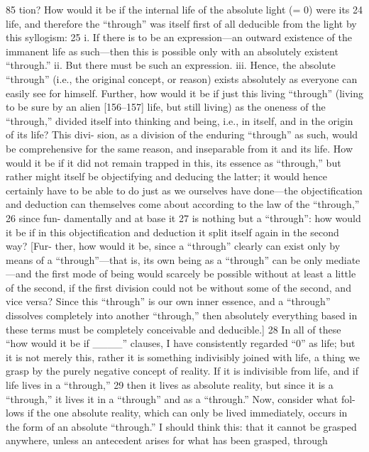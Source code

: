 85
tion? How would it be if the internal life of the absolute light (= 0) were its 24
life, and therefore the “through” was itself first of all deducible from the light
by this syllogism: 25
i. If there is to be an expression—an outward existence of the immanent life
as such—then this is possible only with an absolutely existent “through.”
ii. But there must be such an expression.
iii. Hence, the absolute “through” (i.e., the original concept, or reason) exists
absolutely as everyone can easily see for himself.
Further, how would it be if just this living “through” (living to be sure by
an alien [156–157] life, but still living) as the oneness of the “through,” divided
itself into thinking and being, i.e., in itself, and in the origin of its life? This divi-
sion, as a division of the enduring “through” as such, would be comprehensive
for the same reason, and inseparable from it and its life. How would it be if it
did not remain trapped in this, its essence as “through,” but rather might itself
be objectifying and deducing the latter; it would hence certainly have to be
able to do just as we ourselves have done—the objectification and deduction
can themselves come about according to the law of the “through,” 26 since fun-
damentally and at base it 27 is nothing but a “through”: how would it be if in
this objectification and deduction it split itself again in the second way? [Fur-
ther, how would it be, since a “through” clearly can exist only by means of a
“through”—that is, its own being as a “through” can be only mediate—and the
first mode of being would scarcely be possible without at least a little of the
second, if the first division could not be without some of the second, and vice
versa? Since this “through” is our own inner essence, and a “through” dissolves
completely into another “through,” then absolutely everything based in these
terms must be completely conceivable and deducible.] 28 In all of these “how
would it be if ____” clauses, I have consistently regarded “0” as life; but it is
not merely this, rather it is something indivisibly joined with life, a thing we
grasp by the purely negative concept of reality. If it is indivisible from life, and
if life lives in a “through,” 29 then it lives as absolute reality, but since it is a
“through,” it lives it in a “through” and as a “through.” Now, consider what fol-
lows if the one absolute reality, which can only be lived immediately, occurs in
the form of an absolute “through.” I should think this: that it cannot be grasped
anywhere, unless an antecedent arises for what has been grasped, through

